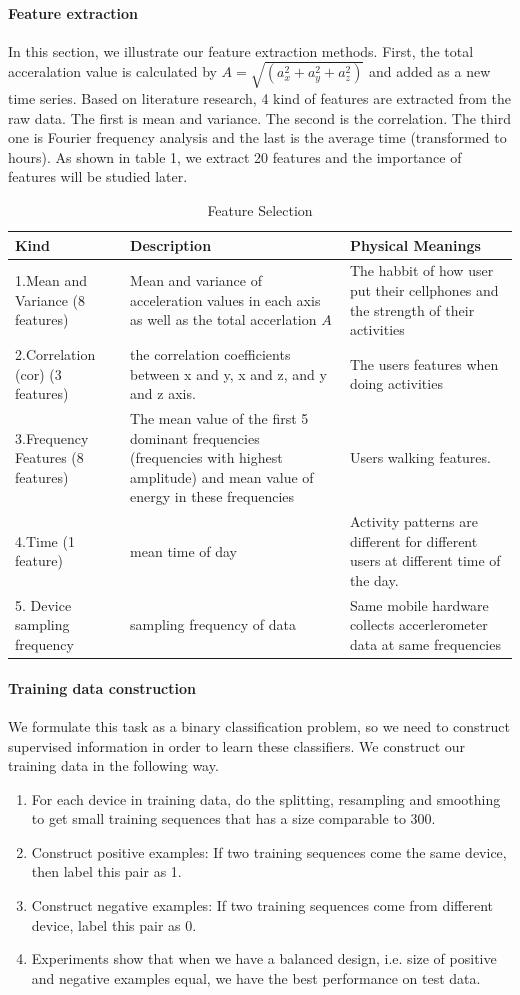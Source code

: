 \documentclass[11pt,letterpaper]{article}
\begin{document}
\paragraph{Feature extraction}
In this section, we illustrate our feature extraction methods.
First, the total acceralation value is calculated by $A=\sqrt{(a_x^2+a_y^2+a_z^2)}$ and added as a new time series. Based on literature research, 4 kind of features are extracted from the raw data. The first is mean and variance. The second is the correlation. The third one is Fourier frequency analysis and the last is the average time (transformed to hours). As shown in table 1, we extract 20 features and the importance of features will be studied later.
		\begin{table}
			\centering
			\caption{Feature Selection}
			\begin{tabular}{p{3cm}|p{6cm}|p{4cm}}
			Kind & Description & Physical Meanings \\ \hline
			1.Mean and Variance (8 features) & Mean and variance of acceleration values in each axis as well as the total accerlation $A$ & The habbit of how user put their cellphones and the strength of their activities \\ \hline
			2.Correlation (cor) (3 features) & the correlation coefficients between x and y, x and z, and y and z axis. & The users features when doing activities \\ \hline
			3.Frequency Features (8 features) & The mean value of the first 5 dominant frequencies (frequencies with highest amplitude) and mean value of energy in these frequencies & Users walking features.\\ \hline
			4.Time (1 feature) & mean time of day & Activity patterns are different for different users at different time of the day.\\ \hline
			5. Device sampling frequency & sampling frequency of data & Same mobile hardware collects accerlerometer data at same frequencies
			\end{tabular}
		\end{table}
\paragraph{Training data construction}
We formulate this task as a binary classification problem, so we need to construct supervised information in order to learn these classifiers. We construct our training data in the following way.
\begin{enumerate}
\item For each device in training data, do the splitting, resampling and smoothing to get small training sequences that has a size comparable to 300.
\item Construct positive examples: If two training sequences come the same device, then label this pair as 1.
\item Construct negative examples: If two training sequences come from different device, label this pair as 0.
\item Experiments show that when we have a balanced design, i.e. size of positive and negative examples equal, we have the best performance on test data.
\end{enumerate}
\end{document}
